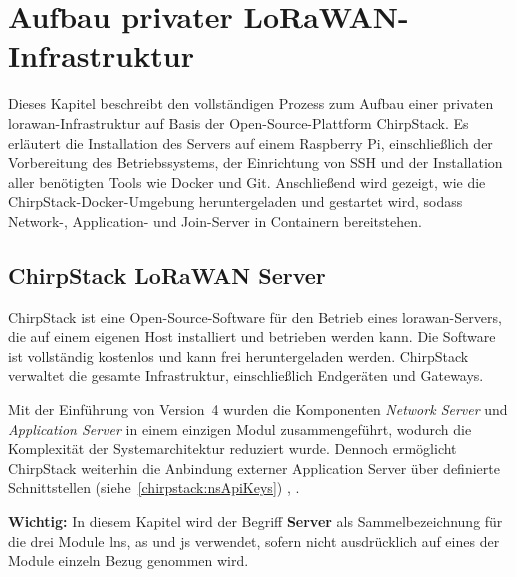 %
%

\chapter{Aufbau privater LoRaWAN-Infrastruktur}

	Dieses Kapitel beschreibt den vollständigen Prozess zum Aufbau einer privaten \ac{lorawan}-Infrastruktur auf Basis der Open-Source-Plattform ChirpStack. Es erläutert die Installation des Servers auf einem Raspberry Pi, einschlie{\ss}lich der Vorbereitung des Betriebssystems, der Einrichtung von SSH und der Installation aller benötigten Tools wie Docker und Git. Anschlie{\ss}end wird gezeigt, wie die ChirpStack-Docker-Umgebung heruntergeladen und gestartet wird, sodass Network-, Application- und Join-Server in Containern bereitstehen.
	
\section{ChirpStack LoRaWAN Server \label{LNS:ChirpstackGeneral}}
	ChirpStack ist eine Open-Source-Software für den Betrieb eines \ac{lorawan}-Servers, die auf einem eigenen Host installiert und betrieben werden kann. Die Software ist vollständig kostenlos und kann frei heruntergeladen werden. ChirpStack verwaltet die gesamte Infrastruktur, einschlie{\ss}lich Endgeräten und Gateways.
	
	Mit der Einführung von Version~4 wurden die Komponenten \emph{Network Server} und \emph{Application Server} in einem einzigen Modul zusammengeführt, wodurch die Komplexität der Systemarchitektur reduziert wurde. Dennoch ermöglicht ChirpStack weiterhin die Anbindung externer Application Server über definierte Schnittstellen (siehe~\ref{chirpstack:nsApiKeys}) \cite{ChirpStack:2022d}, \cite{Garcia:2025b}.
	
	\vspace{0.5cm}

	\textbf{Wichtig:} In diesem Kapitel wird der Begriff \textbf{Server} als Sammelbezeichnung für die drei Module \ac{lns}, \ac{as} und \ac{js} verwendet, sofern nicht ausdrücklich auf eines der Module einzeln Bezug genommen wird.
	
	\vspace{0.5cm}
	
